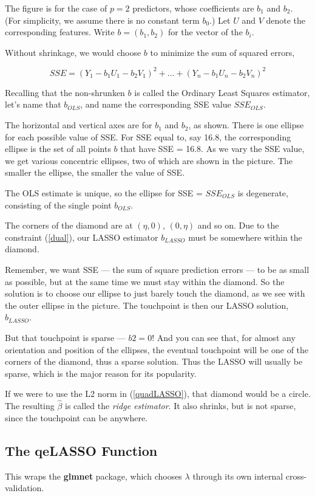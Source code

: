The figure is for the case of $p = 2$ predictors, whose coefficients are
$b_1$ and $b_2$.  (For simplicity, we assume there is no constant term
$b_0$.)  Let $U$ and $V$ denote the corresponding features.
Write $b = (b_1,b_2)$ for the vector of the $b_i$.

Without shrinkage, we would choose $b$ to minimize the sum of squared
errors,

\begin{equation}
\label{sse}
SSE = (Y_1 - b_1 U_1 - b_2 V_1)^2 + ... +
(Y_n - b_1 U_n - b_2 V_n)^2
\end{equation}

Recalling that the non-shrunken $b$ is called the Ordinary Least Squares
estimator, let's name that $b_{OLS}$, and name the corresponding SSE value
$SSE_{OLS}$.

The horizontal and vertical axes are for $b_1$ and $b_2$, as shown.  There is one ellipse for each possible value of SSE.  For SSE equal to, say 16.8, the corresponding ellipse is the set of all points $b$ that have SSE = 16.8. As we vary the SSE value, we get various concentric ellipses, two of which are shown in the picture.  The smaller the ellipse, the smaller the value of SSE.

The OLS estimate is unique, so the ellipse for SSE = $SSE_{OLS}$ is
degenerate, consisting of the single point $b_{OLS}$.

The corners of the diamond are at $(\eta,0)$, $(0,\eta)$ and so on.  Due
to the constraint (\ref{dual}), our LASSO estimator $b_{LASSO}$
must be somewhere within the diamond.

Remember, we want SSE --- the sum of square prediction errors --- to be
as small as possible, but at the same time we must stay within the
diamond.  So the solution is to choose our ellipse to just barely touch
the diamond, as we see with the outer ellipse in the picture.  The
touchpoint is then our LASSO solution, $b_{LASSO}$.

But that touchpoint is sparse --- $b2 = 0$!  And you can see that, for
almost any orientation and position of the ellipses, the eventual
touchpoint will be one of the corners of the diamond, thus a sparse
solution.  Thus the LASSO will usually be sparse, which is the major
reason for its popularity.

If we were to use the L2 norm in (\ref{quadLASSO}), that diamond would
be a circle.  The resulting $\widehat{\beta}$ is called the
\textit{ridge estimator}.  It also shrinks, but is not sparse, since the
touchpoint can be anywhere.

\subsection{The qeLASSO Function}

This wraps the \textbf{glmnet} package, which chooses $\lambda$ through
its own internal cross-validation.

